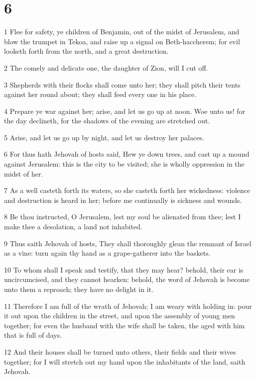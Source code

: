 \chapter{6}

\par 1 Flee for safety, ye children of Benjamin, out of the midst of Jerusalem, and blow the trumpet in Tekoa, and raise up a signal on Beth-haccherem; for evil looketh forth from the north, and a great destruction.
\par 2 The comely and delicate one, the daughter of Zion, will I cut off.
\par 3 Shepherds with their flocks shall come unto her; they shall pitch their tents against her round about; they shall feed every one in his place.
\par 4 Prepare ye war against her; arise, and let us go up at noon. Woe unto us! for the day declineth, for the shadows of the evening are stretched out.
\par 5 Arise, and let us go up by night, and let us destroy her palaces.
\par 6 For thus hath Jehovah of hosts said, Hew ye down trees, and cast up a mound against Jerusalem: this is the city to be visited; she is wholly oppression in the midst of her.
\par 7 As a well casteth forth its waters, so she casteth forth her wickedness: violence and destruction is heard in her; before me continually is sickness and wounds.
\par 8 Be thou instructed, O Jerusalem, lest my soul be alienated from thee; lest I make thee a desolation, a land not inhabited.
\par 9 Thus saith Jehovah of hosts, They shall thoroughly glean the remnant of Israel as a vine: turn again thy hand as a grape-gatherer into the baskets.
\par 10 To whom shall I speak and testify, that they may hear? behold, their ear is uncircumcised, and they cannot hearken: behold, the word of Jehovah is become unto them a reproach; they have no delight in it.
\par 11 Therefore I am full of the wrath of Jehovah; I am weary with holding in: pour it out upon the children in the street, and upon the assembly of young men together; for even the husband with the wife shall be taken, the aged with him that is full of days.
\par 12 And their houses shall be turned unto others, their fields and their wives together; for I will stretch out my hand upon the inhabitants of the land, saith Jehovah.
